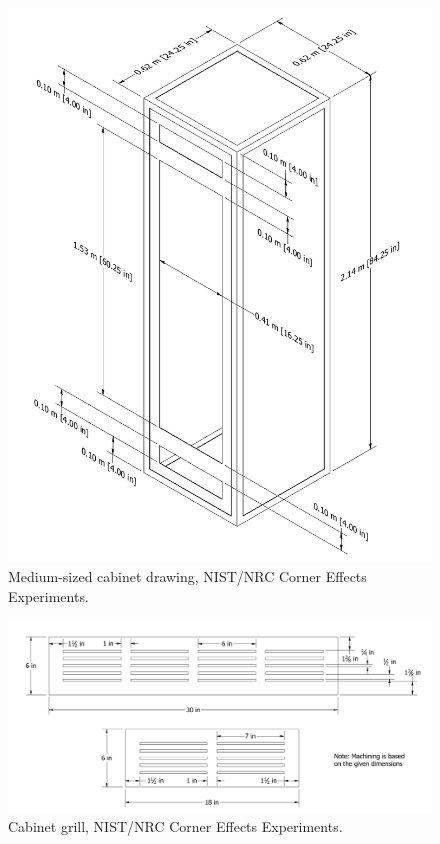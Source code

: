 \begin{figure}[p]
\includegraphics[width=\textwidth]{FIGURES/NIST_NRC_Corner_Effects/Cabinet_2x2x7}
\caption[Medium-sized cabinet drawing, NIST/NRC Corner Effects Experiments]{Medium-sized cabinet drawing, NIST/NRC Corner Effects Experiments.}
\label{Medium_Cabinet}
\end{figure}

\begin{figure}[!ht]
\includegraphics[width=\textwidth]{FIGURES/NIST_NRC_Corner_Effects/28_inch_grill}
\caption[Cabinet grill, NIST/NRC Corner Effects Experiments]{Cabinet grill, NIST/NRC Corner Effects Experiments.}
\label{cabinet_grill}
\end{figure}


